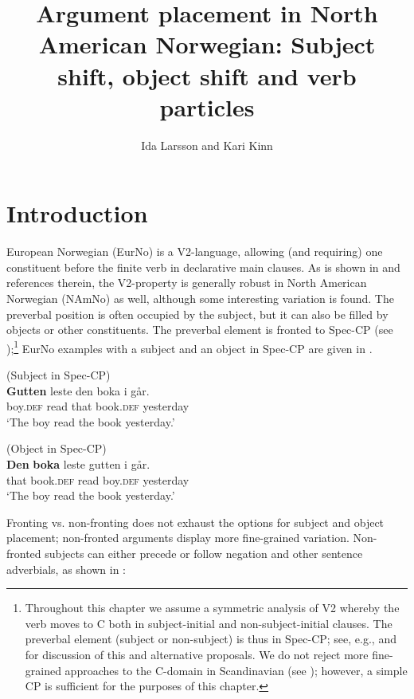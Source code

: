 \documentclass[output=paper]{langscibook}
\author{Ida Larsson\orcid{}\affiliation{Østfold University College} and Kari Kinn\affiliation{University of Bergen}}
\title[Argument placement in North American Norwegian]
	  {Argument placement in North American Norwegian: Subject shift, object shift and verb particles}
\begin{document}
\maketitle 


\section{Introduction}\label{sec:larsson:1}

European Norwegian (EurNo) is a V2-language, allowing (and requiring) one constituent before the finite verb in declarative main clauses. As is shown in  and references therein, the V2-property is generally robust in North American Norwegian (NAmNo) as well, although some interesting variation is found. The preverbal position is often occupied by the subject, but it can also be filled by objects or other constituents. The preverbal element is fronted to Spec-CP (see );\footnote{Throughout this chapter we assume a symmetric analysis of V2 whereby the verb moves to C both in subject-initial and non-subject-initial clauses. The preverbal element (subject or non-subject) is thus in Spec-CP; see, e.g., \citet[362ff]{Holmberg2015} and  for discussion of this and alternative proposals. We do not reject more fine-grained approaches to the C-domain in Scandinavian (see \citealt{LarssonForthcoming}); however, a simple CP is sufficient for the purposes of this chapter.}  EurNo examples with a subject and an object in Spec-CP are given in .

\ea \label{ex:larsson:1}
\ea (Subject in Spec-CP)\label{ex:larsson:1a}\\
\gll \textbf{Gutten} leste den boka {i går}.\\
      boy.\textsc{def} read that book.\textsc{def} yesterday\\
\glt ‘The boy read the book yesterday.’

\ex (Object in Spec-CP)\label{ex:larsson:1b}\\
\gll \textbf{Den} \textbf{boka} leste gutten {i går}.\\
     that book.\textsc{def} read boy.\textsc{def} yesterday\\
\glt ‘The boy read the book yesterday.’
\z
\z

Fronting vs. non-fronting does not exhaust the options for subject and object placement; non-fronted arguments display more fine-grained variation. Non-fronted subjects can either precede or follow negation and other sentence adverbials, as shown in :
\end{document}
